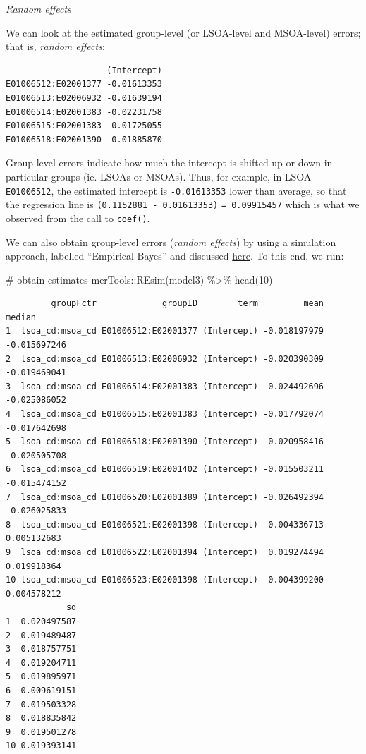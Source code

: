 \documentclass[
  letterpaper,
  DIV=11,
  numbers=noendperiod,
  oneside]{scrreprt}
\newenvironment{Shaded}{\begin{snugshade}}{\end{snugshade}}
\newcommand{\CommentTok}[1]{\textcolor[rgb]{0.37,0.37,0.37}{#1}}
\newcommand{\DecValTok}[1]{\textcolor[rgb]{0.68,0.00,0.00}{#1}}
\newcommand{\FunctionTok}[1]{\textcolor[rgb]{0.28,0.35,0.67}{#1}}
\newcommand{\NormalTok}[1]{\textcolor[rgb]{0.00,0.23,0.31}{#1}}
\newcommand{\OtherTok}[1]{\textcolor[rgb]{0.00,0.23,0.31}{#1}}
\newcommand{\SpecialCharTok}[1]{\textcolor[rgb]{0.37,0.37,0.37}{#1}}
\begin{document}
\emph{Random effects}

We can look at the estimated group-level (or LSOA-level and MSOA-level)
errors; that is, \emph{random effects}:

\begin{Shaded}
\end{Shaded}

\begin{verbatim}
                    (Intercept)
E01006512:E02001377 -0.01613353
E01006513:E02006932 -0.01639194
E01006514:E02001383 -0.02231758
E01006515:E02001383 -0.01725055
E01006518:E02001390 -0.01885870
\end{verbatim}

Group-level errors indicate how much the intercept is shifted up or down
in particular groups (ie. LSOAs or MSOAs). Thus, for example, in LSOA
\texttt{E01006512}, the estimated intercept is \texttt{-0.01613353}
lower than average, so that the regression line is
\texttt{(0.1152881\ -\ 0.01613353)} \texttt{=\ 0.09915457} which is what
we observed from the call to \texttt{coef()}.

We can also obtain group-level errors (\emph{random effects}) by using a
simulation approach, labelled ``Empirical Bayes'' and discussed
\href{https://stat.ethz.ch/pipermail/r-sig-mixed-models/2009q4/002984.html}{here}.
To this end, we run:

\begin{Shaded}
\begin{Highlighting}[]
\CommentTok{\# obtain estimates}
\NormalTok{merTools}\SpecialCharTok{::}\FunctionTok{REsim}\NormalTok{(model3) }\SpecialCharTok{\%\textgreater{}\%} 
  \FunctionTok{head}\NormalTok{(}\DecValTok{10}\NormalTok{)}
\end{Highlighting}
\end{Shaded}

\begin{verbatim}
         groupFctr             groupID        term         mean       median
1  lsoa_cd:msoa_cd E01006512:E02001377 (Intercept) -0.018197979 -0.015697246
2  lsoa_cd:msoa_cd E01006513:E02006932 (Intercept) -0.020390309 -0.019469041
3  lsoa_cd:msoa_cd E01006514:E02001383 (Intercept) -0.024492696 -0.025086052
4  lsoa_cd:msoa_cd E01006515:E02001383 (Intercept) -0.017792074 -0.017642698
5  lsoa_cd:msoa_cd E01006518:E02001390 (Intercept) -0.020958416 -0.020505708
6  lsoa_cd:msoa_cd E01006519:E02001402 (Intercept) -0.015503211 -0.015474152
7  lsoa_cd:msoa_cd E01006520:E02001389 (Intercept) -0.026492394 -0.026025833
8  lsoa_cd:msoa_cd E01006521:E02001398 (Intercept)  0.004336713  0.005132683
9  lsoa_cd:msoa_cd E01006522:E02001394 (Intercept)  0.019274494  0.019918364
10 lsoa_cd:msoa_cd E01006523:E02001398 (Intercept)  0.004399200  0.004578212
            sd
1  0.020497587
2  0.019489487
3  0.018757751
4  0.019204711
5  0.019895971
6  0.009619151
7  0.019503328
8  0.018835842
9  0.019501278
10 0.019393141
\end{verbatim}
\end{document}
